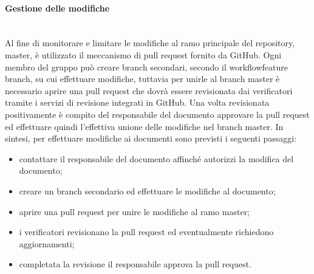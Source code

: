 	\paragraph{Gestione delle modifiche}\mbox{}\\ [1mm]
		Al fine di monitorare e limitare le modifiche al ramo principale del repository\glo, master, è utilizzato il meccanismo di pull request fornito da GitHub. Ogni membro del gruppo può creare branch secondari, secondo il workflow\glosp feature branch, su cui effettuare modifiche, tuttavia per unirle al branch master è necessario aprire una pull request che dovrà essere revisionata dai verificatori tramite i servizi di revisione integrati in GitHub. Una volta revisionata positivamente è compito del responsabile del documento approvare la pull request ed effettuare quindi l'effettiva unione delle modifiche nel branch master.
		\newline
		In sintesi, per effettuare modifiche ai documenti sono previsti i seguenti passaggi:
		\begin{itemize}
			\item contattare il responsabile del documento affinché autorizzi la modifica del documento;
			\item creare un branch secondario ed effettuare le modifiche al documento;
			\item aprire una pull request per unire le modifiche al ramo master;
			\item i verificatori revisionano la pull request ed eventualmente richiedono aggiornamenti;
			\item completata la revisione il responsabile approva la pull request.
		\end{itemize}
		
